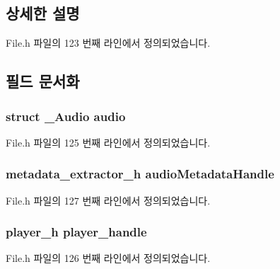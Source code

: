 \subsection{상세한 설명}


File.\-h 파일의 123 번째 라인에서 정의되었습니다.



\subsection{필드 문서화}
\hypertarget{struct___audio_extends_a5fd9dfc5896f2475249e5814bc957cd3}{
\subsubsection[{audio}]{\setlength{\rightskip}{0pt plus 5cm}struct {\bf \-\_\-\-Audio} audio}}\label{struct___audio_extends_a5fd9dfc5896f2475249e5814bc957cd3}


File.\-h 파일의 125 번째 라인에서 정의되었습니다.

\hypertarget{struct___audio_extends_afb8274c680a31f19a7967b768e11ba52}{
\subsubsection[{audio\-Metadata\-Handle}]{\setlength{\rightskip}{0pt plus 5cm}metadata\-\_\-extractor\-\_\-h audio\-Metadata\-Handle}}\label{struct___audio_extends_afb8274c680a31f19a7967b768e11ba52}


File.\-h 파일의 127 번째 라인에서 정의되었습니다.

\hypertarget{struct___audio_extends_acdbf0738be9fa70a60412d48cad881ee}{
\subsubsection[{player\-\_\-handle}]{\setlength{\rightskip}{0pt plus 5cm}player\-\_\-h player\-\_\-handle}}\label{struct___audio_extends_acdbf0738be9fa70a60412d48cad881ee}


File.\-h 파일의 126 번째 라인에서 정의되었습니다.

